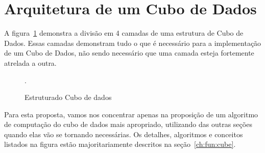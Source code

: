 \section{Arquitetura de um Cubo de Dados}
\label{ch:prop:cubearch}

A figura~\ref{fig:cubearch} demonstra a divisão em 4 camadas de uma estrutura de Cubo de Dados.
Essas camadas demonstram tudo o que é necessário para a implementação de um Cubo de Dados, não sendo necessário que uma camada esteja fortemente atrelada a outra.

\begin{figure}[ht]
	\caption{Estruturado Cubo de dados}\label{fig:cubearch}
	\vspace{6mm}
	\begin{center}
	\end{center}
	\vspace{2mm}
	\legenda{}
	.
\end{figure}

Para esta proposta, vamos nos concentrar apenas na proposição de um algoritmo de computação do cubo de dados mais apropriado, utilizando das outras seções quando elas vão se tornando necessárias.
Os detalhes, algoritmos e conceitos listados na figura estão majoritariamente descritos na seção~\ref{ch:fun:cube}.

